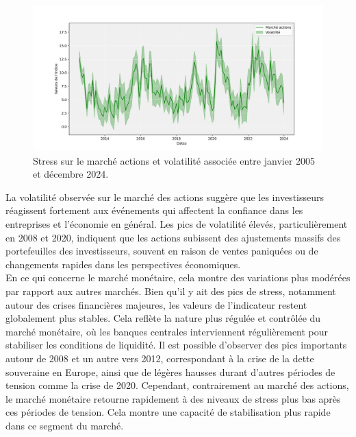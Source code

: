 \begin{figure}[H]
    \centering
    \includegraphics[width=1\linewidth]{images/sous_indicateurs_equity_stress_equity.png}
    \caption{Stress sur le marché actions et volatilité associée entre janvier 2005 et décembre 2024.}
    \label{fig:enter-label}
\end{figure}

La volatilité observée sur le marché des actions suggère que les investisseurs réagissent fortement aux événements qui affectent la confiance dans les entreprises et l’économie en général. Les pics de volatilité élevés, particulièrement en 2008 et 2020, indiquent que les actions subissent des ajustements massifs des portefeuilles des investisseurs, souvent en raison de ventes paniquées ou de changements rapides dans les perspectives économiques.\\

En ce qui concerne le marché monétaire, cela montre des variations plus modérées par rapport aux autres marchés. Bien qu’il y ait des pics de stress, notamment autour des crises financières majeures, les valeurs de l'indicateur restent globalement plus stables. Cela reflète la nature plus régulée et contrôlée du marché monétaire, où les banques centrales interviennent régulièrement pour stabiliser les conditions de liquidité. Il est possible d'observer des pics importants autour de 2008 et un autre vers 2012, correspondant à la crise de la dette souveraine en Europe, ainsi que de légères hausses durant d'autres périodes de tension comme la crise de 2020. Cependant, contrairement au marché des actions, le marché monétaire retourne rapidement à des niveaux de stress plus bas après ces périodes de tension. Cela montre une capacité de stabilisation plus rapide dans ce segment du marché.

